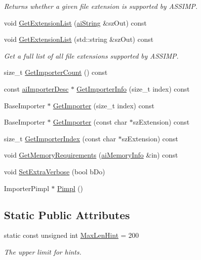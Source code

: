 \begin{CompactItemize}
\begin{CompactList}\small\item\em Returns whether a given file extension is supported by ASSIMP. \item\end{CompactList}\item 
void \hyperlink{class_assimp_1_1_importer_23c85647f7977012d9fef20b36c2d579}{GetExtensionList} (\hyperlink{structai_string}{aiString} \&szOut) const 
\item 
void \hyperlink{class_assimp_1_1_importer_6ab684351c55e170de3c5b7d730b306d}{GetExtensionList} (std::string \&szOut) const 
\begin{CompactList}\small\item\em Get a full list of all file extensions supported by ASSIMP. \item\end{CompactList}\item 
size\_\-t \hyperlink{class_assimp_1_1_importer_fe982451f1a1c9b0b59c788f9329ccc1}{GetImporterCount} () const 
\item 
const \hyperlink{structai_importer_desc}{aiImporterDesc} $\ast$ \hyperlink{class_assimp_1_1_importer_857dd22e071521c7747dc909f6a8f6f9}{GetImporterInfo} (size\_\-t index) const 
\item 
BaseImporter $\ast$ \hyperlink{class_assimp_1_1_importer_712a0545a11c9d198392867552ba6646}{GetImporter} (size\_\-t index) const 
\item 
BaseImporter $\ast$ \hyperlink{class_assimp_1_1_importer_18921ab411273fa95961f60848ad6007}{GetImporter} (const char $\ast$szExtension) const 
\item 
size\_\-t \hyperlink{class_assimp_1_1_importer_ee103460f66b9cbe3143400ec92ffc56}{GetImporterIndex} (const char $\ast$szExtension) const 
\item 
void \hyperlink{class_assimp_1_1_importer_ba2eacd0b627cb481b6d66d9ca55eac9}{GetMemoryRequirements} (\hyperlink{structai_memory_info}{aiMemoryInfo} \&in) const 
\item 
void \hyperlink{class_assimp_1_1_importer_9bb793072c84c784279d0f6e870bb42d}{SetExtraVerbose} (bool bDo)
\item 
ImporterPimpl $\ast$ \hyperlink{class_assimp_1_1_importer_c112839f323a630f83395acb74746827}{Pimpl} ()
\end{CompactItemize}
\subsection*{Static Public Attributes}
\begin{CompactItemize}
\item 
\hypertarget{class_assimp_1_1_importer_3affe8f98fc9a3b75fc3cb4c4415b37c}{
static const unsigned int \hyperlink{class_assimp_1_1_importer_3affe8f98fc9a3b75fc3cb4c4415b37c}{MaxLenHint} = 200}
\label{class_assimp_1_1_importer_3affe8f98fc9a3b75fc3cb4c4415b37c}

\begin{CompactList}\small\item\em The upper limit for hints. \item\end{CompactList}\end{CompactItemize}


